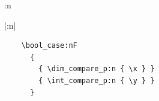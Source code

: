 \documentclass[kernel]{l3doc}
\begin{document}
\begin{function}{\foo:n}
  \begin{syntax}
    |\foo:n| 
  \end{syntax}
  \begin{verbatim}
    \bool_case:nF
      {
        { \dim_compare_p:n { \x } }
        { \int_compare_p:n { \y } }
      }
  \end{verbatim}
\end{function}
\end{document}
